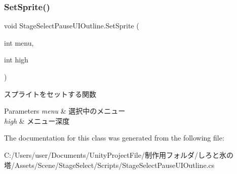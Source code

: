 \subsubsection{\texorpdfstring{Set\+Sprite()}{SetSprite()}}
{\footnotesize\ttfamily void Stage\+Select\+Pause\+U\+I\+Outline.\+Set\+Sprite (\begin{DoxyParamCaption}\item[{int}]{menu,  }\item[{int}]{high }\end{DoxyParamCaption})\hspace{0.3cm}{\ttfamily [inline]}}



スプライトをセットする関数 


\begin{DoxyParams}{Parameters}
{\em menu} & 選択中のメニュー\\
\hline
{\em high} & メニュー深度\\
\hline
\end{DoxyParams}


The documentation for this class was generated from the following file\+:\begin{DoxyCompactItemize}
\item 
C\+:/\+Users/user/\+Documents/\+Unity\+Project\+File/制作用フォルダ/しろと氷の塔/\+Assets/\+Scene/\+Stage\+Select/\+Scripts/Stage\+Select\+Pause\+U\+I\+Outline.\+cs\end{DoxyCompactItemize}
